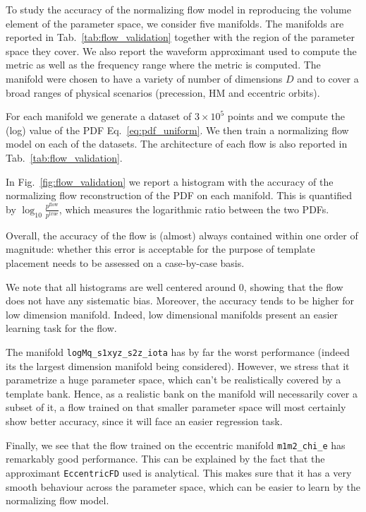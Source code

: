 \documentclass[twocolumn,showpacs,preprintnumbers,nofootinbib,prd,
superscriptaddress,10pt]{revtex4-2}
\begin{document}
To study the accuracy of the normalizing flow model in reproducing the volume element of the parameter space, we consider five manifolds. The manifolds are reported in Tab.~\ref{tab:flow_validation} together with the region of the parameter space they cover. We also report the waveform approximant used to compute the metric as well as the frequency range where the metric is computed.
The manifold were chosen to have a variety of number of dimensions $D$ and to cover a broad ranges of physical scenarios (precession, HM and eccentric orbits).

For each manifold we generate a dataset of $3\times 10^5$ points and we compute the (log) value of the PDF Eq.~\eqref{eq:pdf_uniform}. We then train a normalizing flow model on each of the datasets.
The architecture of each flow is also reported in Tab.~\ref{tab:flow_validation}.

In Fig.~\ref{fig:flow_validation} we report a histogram with the accuracy of the normalizing flow reconstruction of the PDF on each manifold. This is quantified by $\log_{10}\frac{p^\mathrm{flow}}{p^\mathrm{true}}$, which measures the logarithmic ratio between the two PDFs.

Overall, the accuracy of the flow is (almost) always contained within one order of magnitude: whether this error is acceptable for the purpose of template placement needs to be assessed on a case-by-case basis.

We note that all histograms are well centered around $0$, showing that the flow does not have any sistematic bias. Moreover, the accuracy tends to be higher for low dimension manifold. Indeed, low dimensional manifolds present an easier learning task for the flow.

The manifold \texttt{logMq\_s1xyz\_s2z\_iota} has by far the worst performance (indeed its the largest dimension manifold being considered). However, we stress that it parametrize a huge parameter space, which can't be realistically covered by a template bank. Hence, as a realistic bank on the manifold will necessarily cover a subset of it, a flow trained on that smaller parameter space will most certainly show better accuracy, since it will face an easier regression task.

Finally, we see that the flow trained on the eccentric manifold \texttt{m1m2\_chi\_e} has remarkably good performance. This can be explained by the fact that the approximant \texttt{EccentricFD} \cite{lalsuite} used is analytical. This makes sure that it has a very smooth behaviour across the parameter space, which can be easier to learn by the normalizing flow model.
\end{document}
